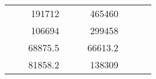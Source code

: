 \begin{table}[H]
\begin{tabular}{|ccrccrccc}
\multicolumn{1}{|c|}{\cellcolor[HTML]{FFFFC7}}                                & \multicolumn{1}{c|}{\cellcolor[HTML]{DDFDFF}}                      & \multicolumn{1}{r|}{\cellcolor[HTML]{DAE8FC}191712}    & \multicolumn{1}{c|}{\cellcolor[HTML]{FFFFC7}}                                & \multicolumn{1}{c|}{\cellcolor[HTML]{DDFDFF}}                       & \multicolumn{1}{r|}{\cellcolor[HTML]{DDFDFF}465460}    &                                                                              &                                                                    &                                                        \\ \cline{3-3} \cline{6-6}
\multicolumn{1}{|c|}{\cellcolor[HTML]{FFFFC7}}                                & \multicolumn{1}{c|}{\cellcolor[HTML]{DDFDFF}}                      & \multicolumn{1}{r|}{\cellcolor[HTML]{DDFDFF}106694}    & \multicolumn{1}{c|}{\cellcolor[HTML]{FFFFC7}}                                & \multicolumn{1}{c|}{\cellcolor[HTML]{DDFDFF}}                       & \multicolumn{1}{r|}{\cellcolor[HTML]{DAE8FC}299458}    &                                                                              &                                                                    &                                                        \\ \cline{3-3} \cline{6-6}
\multicolumn{1}{|c|}{\cellcolor[HTML]{FFFFC7}}                                & \multicolumn{1}{c|}{\cellcolor[HTML]{DDFDFF}}                      & \multicolumn{1}{r|}{\cellcolor[HTML]{DAE8FC}68875.5}   & \multicolumn{1}{c|}{\cellcolor[HTML]{FFFFC7}}                                & \multicolumn{1}{c|}{\cellcolor[HTML]{DDFDFF}}                       & \multicolumn{1}{r|}{\cellcolor[HTML]{DDFDFF}66613.2}   &                                                                              &                                                                    &                                                        \\ \cline{3-3} \cline{6-6}
\multicolumn{1}{|c|}{\cellcolor[HTML]{FFFFC7}}                                & \multicolumn{1}{c|}{\cellcolor[HTML]{DDFDFF}}                      & \multicolumn{1}{r|}{\cellcolor[HTML]{DDFDFF}81858.2}   & \multicolumn{1}{c|}{\cellcolor[HTML]{FFFFC7}}                                & \multicolumn{1}{c|}{\cellcolor[HTML]{DDFDFF}}                       & \multicolumn{1}{r|}{\cellcolor[HTML]{DAE8FC}138309}    &                                                                              &                                                                    &                                                        \\ \cline{3-3} \cline{6-6}

\end{tabular}
\end{table}
